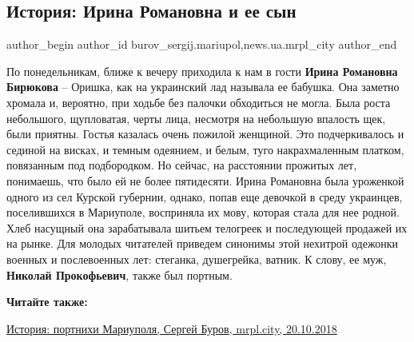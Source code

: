  
 
 
 
 
 
\subsection{История: Ирина Романовна и ее сын}
\label{sec:13_04_2019.stz.news.ua.mrpl_city.1.istoria_irina_romanovna_i_ee_syn}
 
\ifcmt
 author_begin
   author_id burov_sergij.mariupol,news.ua.mrpl_city
 author_end
\fi


По понедельникам, ближе к вечеру приходила к нам в гости \textbf{Ирина Романовна
Бирюкова} – Оришка, как на украинский лад называла ее бабушка. Она заметно
хромала и, вероятно, при ходьбе без палочки обходиться не могла. Была роста
небольшого, щупловатая, черты лица, несмотря на небольшую впалость щек, были
приятны. Гостья казалась очень пожилой женщиной. Это подчеркивалось и сединой
на висках, и темным одеянием, и белым, туго накрахмаленным платком, повязанным
под подбородком. Но сейчас, на расстоянии прожитых лет, понимаешь, что было ей
не более пятидесяти. Ирина Романовна была уроженкой одного из сел Курской
губернии, однако, попав еще девочкой в среду украинцев, поселившихся в
Мариуполе, восприняла их мову, которая стала для нее родной. Хлеб насущный она
зарабатывала шитьем телогреек и последующей продажей их на рынке. Для молодых
читателей приведем синонимы этой нехитрой одежонки военных и послевоенных лет:
стеганка, душегрейка, ватник. К слову, ее муж, \textbf{Николай Прокофьевич}, также был
портным.

\textbf{Читайте также:} 

\href{https://archive.org/details/20_10_2018.sergij_burov.mrpl_city.istoria_portnihi_mariupolja}{%
История: портнихи Мариуполя, Сергей Буров, mrpl.city, 20.10.2018}

